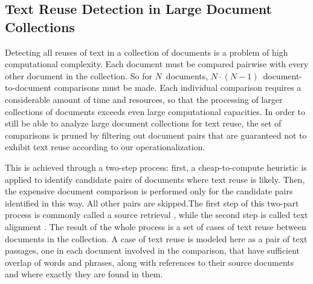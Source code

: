 


\subsection*{Text Reuse Detection in Large Document Collections}

Detecting all reuses of text in a collection of documents is a problem of high computational complexity. Each document must be compared pairwise with every other document in the collection. So for $N$~documents, $N\cdot (N-1)$~document-to-document comparisons must be made. Each individual comparison requires a considerable amount of time and resources, so that the processing of larger collections of documents exceeds even large computational capacities. In order to still be able to analyze large document collections for text reuse, the set of comparisons is pruned by filtering out document pairs that are guaranteed not to exhibit text reuse according to our operationalization.

This is achieved through a two-step process: first, a cheap-to-compute heuristic is applied to identify candidate pairs of documents where text reuse is likely. Then, the expensive document comparison is performed only for the candidate pairs identified in this way. All other pairs are skipped.The first step of this two-part process is commonly called a source retrieval \cite{stein:2007d}, while the second step is called text alignment \cite{potthast:2013e}. The result of the whole process is a set of cases of text reuse between documents in the collection. A case of text reuse is modeled here as a pair of text passages, one in each document involved in the comparison, that have sufficient overlap of words and phrases, along with references to their source documents and where exactly they are found in them.

